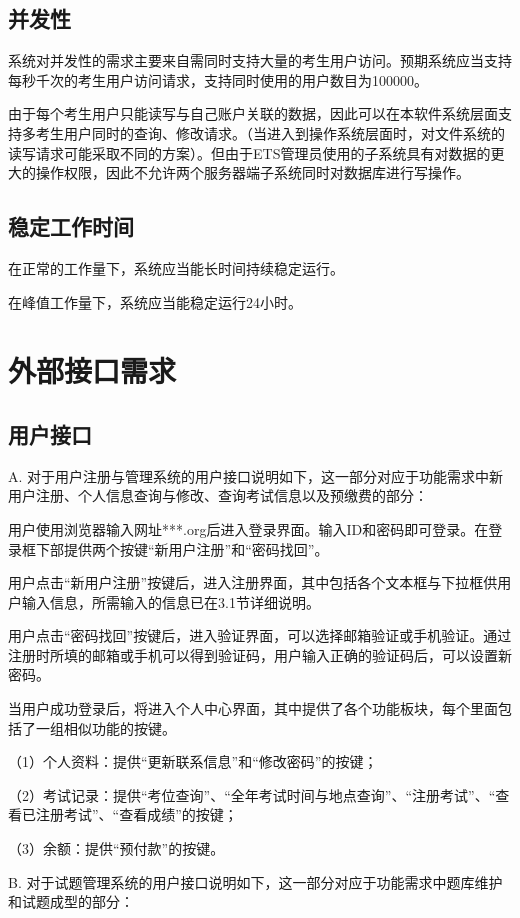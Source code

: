 \subsection{并发性}
系统对并发性的需求主要来自需同时支持大量的考生用户访问。预期系统应当支持每秒千次的考生用户访问请求，支持同时使用的用户数目为100000。

由于每个考生用户只能读写与自己账户关联的数据，因此可以在本软件系统层面支持多考生用户同时的查询、修改请求。（当进入到操作系统层面时，对文件系统的读写请求可能采取不同的方案）。但由于ETS管理员使用的子系统具有对数据的更大的操作权限，因此不允许两个服务器端子系统同时对数据库进行写操作。

\subsection{稳定工作时间}
在正常的工作量下，系统应当能长时间持续稳定运行。

在峰值工作量下，系统应当能稳定运行24小时。

\section{外部接口需求}

\subsection{用户接口}
A. 对于用户注册与管理系统的用户接口说明如下，这一部分对应于功能需求中新用户注册、个人信息查询与修改、查询考试信息以及预缴费的部分：

用户使用浏览器输入网址***.org后进入登录界面。输入ID和密码即可登录。在登录框下部提供两个按键“新用户注册”和“密码找回”。

用户点击“新用户注册”按键后，进入注册界面，其中包括各个文本框与下拉框供用户输入信息，所需输入的信息已在3.1节详细说明。

用户点击“密码找回”按键后，进入验证界面，可以选择邮箱验证或手机验证。通过注册时所填的邮箱或手机可以得到验证码，用户输入正确的验证码后，可以设置新密码。

当用户成功登录后，将进入个人中心界面，其中提供了各个功能板块，每个里面包括了一组相似功能的按键。

（1）个人资料：提供“更新联系信息”和“修改密码”的按键；
	
（2）考试记录：提供“考位查询”、“全年考试时间与地点查询”、“注册考试”、“查看已注册考试”、“查看成绩”的按键；

（3）余额：提供“预付款”的按键。

B. 对于试题管理系统的用户接口说明如下，这一部分对应于功能需求中题库维护和试题成型的部分：

